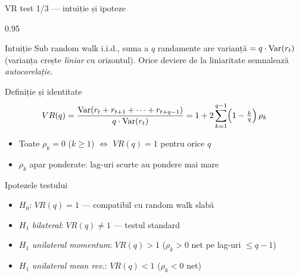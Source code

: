 \documentclass[9pt, aspectratio=169, t]{beamer}
\begin{document}
\begin{frame}[shrink=10]{VR test 1/3 --- intuiție și ipoteze}
\begin{cminipage}{0.95\textwidth}
\begin{block}{Intuiție}
\footnotesize
Sub random walk i.i.d., suma a $q$ randamente are varianță $= q \cdot \text{Var}(r_t)$ (varianța crește \emph{liniar} cu orizontul). Orice deviere de la liniaritate semnalează \emph{autocorelație}.
\end{block}
\begin{block}{Definiție și identitate}
\footnotesize
\[
    VR(q) = \frac{\text{Var}(r_t + r_{t+1} + \cdots + r_{t+q-1})}{q \cdot \text{Var}(r_t)} = 1 + 2\sum_{k=1}^{q-1}\!\left(1 - \tfrac{k}{q}\right)\rho_k
\]
\begin{itemize}\setlength{\itemsep}{0pt}
    \item Toate $\rho_k = 0$ ($k \geq 1$) $\Leftrightarrow$ $VR(q) = 1$ pentru orice $q$
    \item $\rho_k$ apar ponderate: lag-uri scurte au pondere mai mare
\end{itemize}
\end{block}
\begin{exampleblock}{Ipotezele testului}
\footnotesize
\begin{itemize}\setlength{\itemsep}{0pt}
    \item $H_0$: $VR(q) = 1$ --- compatibil cu random walk slabă
    \item $H_1$ \emph{bilateral}: $VR(q) \neq 1$ --- testul standard
    \item $H_1$ \emph{unilateral momentum}: $VR(q) > 1$ ($\rho_k > 0$ net pe lag-uri $\leq q-1$)
    \item $H_1$ \emph{unilateral mean rev.}: $VR(q) < 1$ ($\rho_k < 0$ net)
\end{itemize}
\end{exampleblock}
\end{cminipage}
\end{frame}
\end{document}
